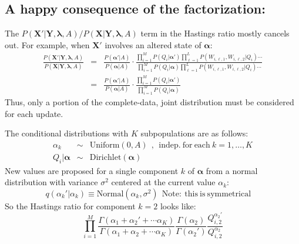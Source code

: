 \vspace*{-.3in}
\subsection*{A happy consequence of the factorization:}
The $P(\mathbf{X'}|\mathbf{Y},\bm{\lambda},A)/P(\mathbf{X}|\mathbf{Y},\bm{\lambda},A)$ term in the Hastings ratio mostly cancels out.  For example, when $\mathbf{X'}$ involves an altered state of $\bm{\alpha}$:
\addtolength{\jot}{2ex}
{\small
\begin{eqnarray*}
	\frac{P(\mathbf{X'}|\mathbf{Y},\bm{\lambda},A)}{P(\mathbf{X}|\mathbf{Y},\bm{\lambda},A)} & = & 
	\frac{P(\bm{\alpha'}|A)}{P(\bm{\alpha}|A)}\cdot
	\frac{\prod_{i=1}^M P(Q_i|\bm{\alpha'})\prod_{\ell=1}^L P(W_{i,\ell,1},W_{i,\ell,2}|Q_i)\cdots}
	{\prod_{i=1}^M P(Q_i|\bm{\alpha})\prod_{\ell=1}^L P(W_{i,\ell,1},W_{i,\ell,2}|Q_i)\cdots}\\
	& = & \frac{P(\bm{\alpha'}|A)}{P(\bm{\alpha}|A)}\cdot
	\frac{\prod_{i=1}^M P(Q_i|\bm{\alpha'})}
	{\prod_{i=1}^M P(Q_i|\bm{\alpha})}
\end{eqnarray*}
}
Thus, only a portion of the complete-data, joint distribution must be considered for each update. 

The conditional distributions with $K$ subpopulations are as follows:
\begin{eqnarray*}
\alpha_k &\sim& \mathrm{Uniform}(0,A)~~,~~\mathrm{indep.~for~each~}k=1,\ldots,K  \\ 
Q_i | \bm{\alpha} &\sim& \mathrm{Dirichlet}(\bm{\alpha})
\end{eqnarray*}
New values are proposed for a single component $k$ of $\bm{\alpha}$ from a normal distribution with variance $\sigma^2$ centered at the current value $\alpha_k$:
\[
	q(\alpha_k'|\alpha_k) \equiv \mathrm{Normal}(\alpha_k,\sigma^2)~~\mathrm{Note:~this~is~symmetrical}~~~~~
\]
So the Hastings ratio for component $k=2$ looks like:
\[
 \prod_{i=1}^M \frac{\Gamma(\alpha_1+\alpha_2'+\cdots\alpha_K)}{\Gamma(\alpha_1+\alpha_2+\cdots\alpha_K)}
	\frac{\Gamma(\alpha_2)}{\Gamma(\alpha_2')} 
	\frac{Q_{i,2}^{\alpha_2'}}{Q_{i,2}^{\alpha_2}}
\]

